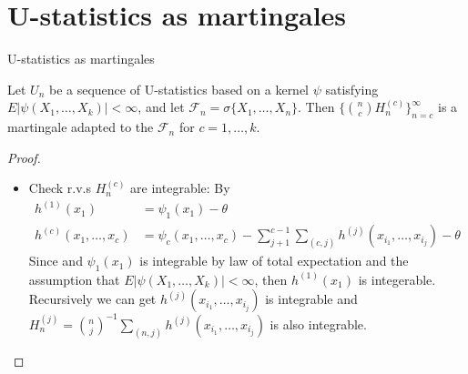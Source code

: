 \documentclass{beamer}
\theoremstyle{definition}
\numberwithin{Def}{section}
\begin{document}
\section{U-statistics as martingales}
\begin{frame}{U-statistics as martingales}
\begin{theorem}\label{mat}
Let $U_n$ be a sequence of U-statistics based on a kernel $\psi$ satisfying $E|\psi(X_1, \dotsc, X_k)|<\infty$, and let $\mathcal{F}_n=\sigma\{X_1, \dotsc, X_n\}$. Then $\{{n \choose c} H_n^{(c)}\}_{n=c}^\infty$ is a martingale adapted to the $\mathcal{F}_n$ for $c=1,\dotsc, k$.
\end{theorem}
\begin{fontsize}{9}{12}
\begin{proof}
\begin{itemize}
    \item Check r.v.s $H_n^{(c)}$ are integrable: By
\begin{align*}
h^{(1)}(x_1)&=\psi_1(x_1)-\theta\\
h^{(c)}(x_1,\dotsc,x_c)&=\psi_c(x_1,\dotsc,x_c)-\sum_{j+1}^{c-1}\sum_{(c,j)}h^{(j)}(x_{i_1},\dotsc,x_{i_j})-\theta
\end{align*}
Since  and $\psi_1(x_1)$ is integrable by law of total expectation and the assumption that $E|\psi(X_1, \dotsc, X_k)|<\infty$, then $h^{(1)}(x_1)$ is integerable. Recursively we can get $h^{(j)}(x_{i_1},\dotsc,x_{i_j})$ is integrable and $H_n^{(j)}={n\choose j}^{-1}\sum_{(n,j)}h^{(j)}(x_{i_1},\dotsc,x_{i_j})$ is also integrable.
\end{itemize}
\end{proof}
\end{fontsize}
\end{frame}
\end{document}
